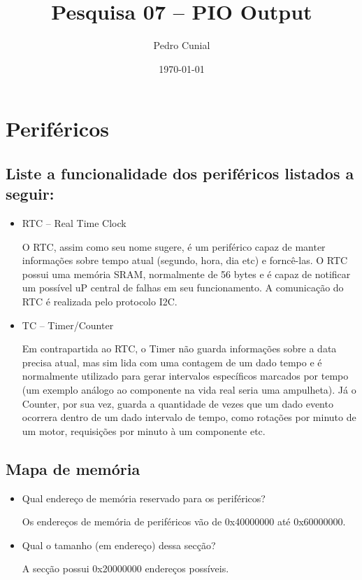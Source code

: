 \documentclass[11pt]{article}
\author{Pedro Cunial}
\date{\today}
\title{Pesquisa 07 -- PIO Output}
\begin{document}
\maketitle
\tableofcontents


\section{Periféricos}
\label{sec:orgheadline4}
\subsection{Liste a funcionalidade dos periféricos listados a seguir:}
\label{sec:orgheadline1}
\begin{itemize}
\item RTC -- Real Time Clock

O RTC, assim como seu nome sugere, é um periférico capaz de manter informações sobre tempo atual (segundo,
hora, dia etc) e forncê-las. O RTC possui uma memória SRAM, normalmente de 56 bytes e é capaz de notificar um
possível uP central de falhas em seu funcionamento. A comunicação do RTC é realizada pelo protocolo I2C.

\item TC -- Timer/Counter

Em contrapartida ao RTC, o Timer não guarda informações sobre a data precisa atual, mas sim lida com uma
contagem de um dado tempo e é normalmente utilizado para gerar intervalos específicos marcados por tempo (um
exemplo análogo ao componente na vida real seria uma ampulheta).
Já o Counter, por sua vez, guarda a quantidade de vezes que um dado evento ocorrera dentro de um dado intervalo
de tempo, como rotações por minuto de um motor, requisições por minuto à um componente etc.
\end{itemize}

\subsection{Mapa de memória}
\label{sec:orgheadline2}
\begin{itemize}
\item Qual endereço de memória reservado para os periféricos?

Os endereços de memória de periféricos vão de 0x40000000 até 0x60000000.

\item Qual o tamanho (em endereço) dessa secção?

A secção possui 0x20000000 endereços possíveis.
\end{itemize}
\end{document}
